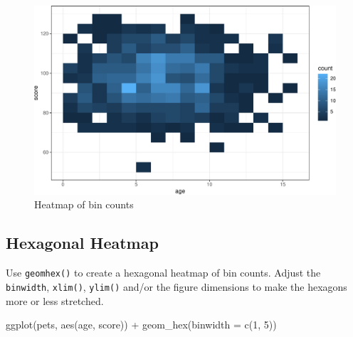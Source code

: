 \documentclass[
  oneside]{book}
\newenvironment{Shaded}{\begin{snugshade}}{\end{snugshade}}
\newcommand{\AttributeTok}[1]{\textcolor[rgb]{0.77,0.63,0.00}{#1}}
\newcommand{\DecValTok}[1]{\textcolor[rgb]{0.00,0.00,0.81}{#1}}
\newcommand{\FunctionTok}[1]{\textcolor[rgb]{0.00,0.00,0.00}{#1}}
\newcommand{\NormalTok}[1]{#1}
\newcommand{\SpecialCharTok}[1]{\textcolor[rgb]{0.00,0.00,0.00}{#1}}
\begin{document}
\begin{figure}

{\centering \includegraphics[width=0.9\linewidth]{images/bin2d-1} 

}

\caption{Heatmap of bin counts}\label{fig:bin2d}
\end{figure}

\hypertarget{geom_hex}{%
\subsection{Hexagonal Heatmap}\label{geom_hex}}

Use \texttt{geomhex()} to create a hexagonal heatmap of bin counts. Adjust the \texttt{binwidth}, \texttt{xlim()}, \texttt{ylim()} and/or the figure dimensions to make the hexagons more or less stretched.

\begin{Shaded}
\begin{Highlighting}[]
\FunctionTok{ggplot}\NormalTok{(pets, }\FunctionTok{aes}\NormalTok{(age, score)) }\SpecialCharTok{+}
  \FunctionTok{geom\_hex}\NormalTok{(}\AttributeTok{binwidth =} \FunctionTok{c}\NormalTok{(}\DecValTok{1}\NormalTok{, }\DecValTok{5}\NormalTok{))}
\end{Highlighting}
\end{Shaded}
\end{document}
